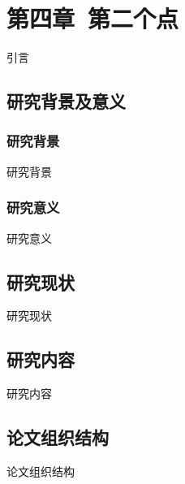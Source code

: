\setcounter{section}{4}
\setcounter{subsection}{0}
\section*{第四章\ 第二个点}
引言
\subsection{研究背景及意义}
\subsubsection{研究背景}
研究背景
\subsubsection{研究意义}
研究意义
\subsection{研究现状}
研究现状
\subsection{研究内容}
研究内容
\subsection{论文组织结构}
论文组织结构

\pagestyle{fancy}			%
\chead{}	%

